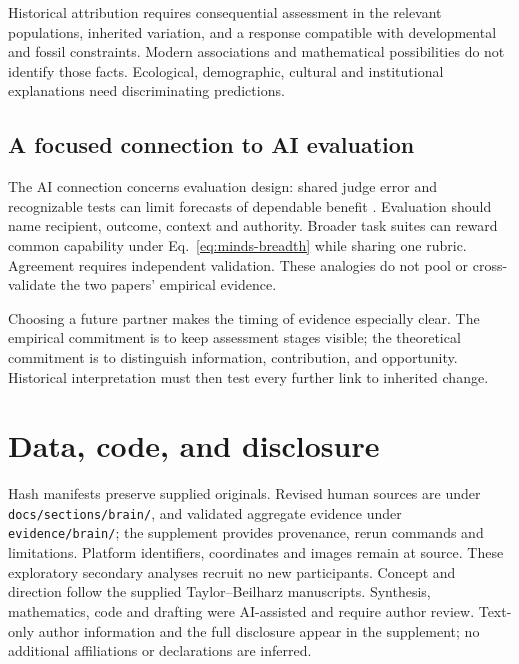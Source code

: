 Historical attribution requires consequential assessment in the relevant populations, inherited variation, and a response compatible with developmental and fossil constraints. Modern associations and mathematical possibilities do not identify those facts. Ecological, demographic, cultural and institutional explanations need discriminating predictions.

\subsection{A focused connection to AI evaluation}

The AI connection concerns evaluation design: shared judge error and recognizable tests can limit forecasts of dependable benefit \citep{gao2023,sharma2024}. Evaluation should name recipient, outcome, context and authority. Broader task suites can reward common capability under Eq.~\eqref{eq:minds-breadth} while sharing one rubric. Agreement requires independent validation. These analogies do not pool or cross-validate the two papers' empirical evidence.

Choosing a future partner makes the timing of evidence especially clear. The empirical commitment is to keep assessment stages visible; the theoretical commitment is to distinguish information, contribution, and opportunity. Historical interpretation must then test every further link to inherited change.

\section*{Data, code, and disclosure}

Hash manifests preserve supplied originals. Revised human sources are under \texttt{docs/sections/brain/}, and validated aggregate evidence under \texttt{evidence/brain/}; the supplement provides provenance, rerun commands and limitations. Platform identifiers, coordinates and images remain at source. These exploratory secondary analyses recruit no new participants. Concept and direction follow the supplied Taylor--Beilharz manuscripts. Synthesis, mathematics, code and drafting were AI-assisted and require author review. Text-only author information and the full disclosure appear in the supplement; no additional affiliations or declarations are inferred.
\label{minds-main-last}
